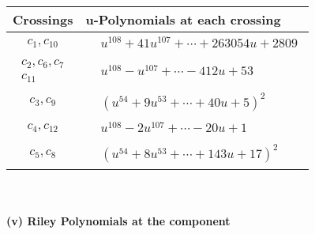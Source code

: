\documentclass[1p]{elsarticle_modified}
\theoremstyle{definition}
\begin{document}
\begin{tabular}{m{50pt}|m{274pt}}
Crossings & \hspace{64pt}u-Polynomials at each crossing \\
\hline $$\begin{aligned}c_{1},c_{10}\end{aligned}$$&$\begin{aligned}
&u^{108}+41 u^{107}+\cdots+263054 u+2809
\end{aligned}$\\
\hline $$\begin{aligned}c_{2},c_{6},c_{7}\\c_{11}\end{aligned}$$&$\begin{aligned}
&u^{108}- u^{107}+\cdots-412 u+53
\end{aligned}$\\
\hline $$\begin{aligned}c_{3},c_{9}\end{aligned}$$&$\begin{aligned}
&(u^{54}+9 u^{53}+\cdots+40 u+5)^{2}
\end{aligned}$\\
\hline $$\begin{aligned}c_{4},c_{12}\end{aligned}$$&$\begin{aligned}
&u^{108}-2 u^{107}+\cdots-20 u+1
\end{aligned}$\\
\hline $$\begin{aligned}c_{5},c_{8}\end{aligned}$$&$\begin{aligned}
&(u^{54}+8 u^{53}+\cdots+143 u+17)^{2}
\end{aligned}$\\
\hline
\end{tabular}\\~\\
\newpage\renewcommand{\arraystretch}{1}
\flushleft \textbf{(v) Riley Polynomials at the component}\newline \\
\end{document}
